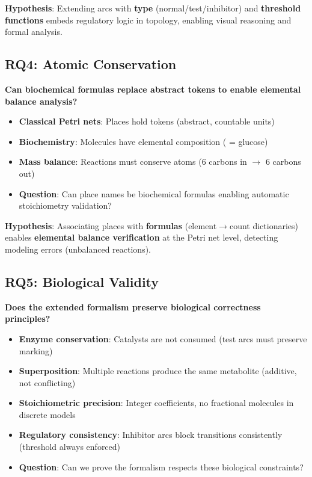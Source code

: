 \textbf{Hypothesis}: Extending arcs with \textbf{type} (normal/test/inhibitor) and \textbf{threshold functions} embeds regulatory logic in topology, enabling visual reasoning and formal analysis.

\subsection{RQ4: Atomic Conservation}
\label{subsec:rq4}

\textbf{Can biochemical formulas replace abstract tokens to enable elemental balance analysis?}

\begin{itemize}
    \item \textbf{Classical Petri nets}: Places hold tokens (abstract, countable units)
    \item \textbf{Biochemistry}: Molecules have elemental composition ( = glucose)
    \item \textbf{Mass balance}: Reactions must conserve atoms (6 carbons in $\to$ 6 carbons out)
    \item \textbf{Question}: Can place names be biochemical formulas enabling automatic stoichiometry validation?
\end{itemize}

\textbf{Hypothesis}: Associating places with \textbf{formulas} (element$\to$count dictionaries) enables \textbf{elemental balance verification} at the Petri net level, detecting modeling errors (unbalanced reactions).

\subsection{RQ5: Biological Validity}
\label{subsec:rq5}

\textbf{Does the extended formalism preserve biological correctness principles?}

\begin{itemize}
    \item \textbf{Enzyme conservation}: Catalysts are not consumed (test arcs must preserve marking)
    \item \textbf{Superposition}: Multiple reactions produce the same metabolite (additive, not conflicting)
    \item \textbf{Stoichiometric precision}: Integer coefficients, no fractional molecules in discrete models
    \item \textbf{Regulatory consistency}: Inhibitor arcs block transitions consistently (threshold always enforced)
    \item \textbf{Question}: Can we prove the formalism respects these biological constraints?
\end{itemize}

